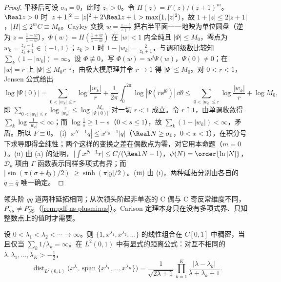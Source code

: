 \begin{proof}
平移后可设 $\sigma_0=0$，此时 $z_1>0$。令 $H(z)=F(z)/(z+1)^m$。$\Real z>0$ 时 $|z+1|^2=|z|^2+2\Real z+1>\max(1,|z|^2)$，故 $1+|z|\le2|z+1|$，$|H|\le2^mC\equiv M_0$。Cayley 变换 $w=\frac{z-1}{z+1}$ 把右半平面一一地映为单位圆盘（逆为 $z=\frac{1+w}{1-w}$），$\Phi(w)=H(\frac{1+w}{1-w})$ 在 $|w|<1$ 内全纯且 $|\Phi|\le M_0$，零点为 $w_k=\frac{z_k-1}{z_k+1}\in(-1,1)$；$z_k>1$ 时 $1-|w_k|=\frac{2}{z_k+1}$，与调和级数比较知 $\sum_k(1-|w_k|)=\infty$。设 $\Phi\not\equiv0$，写 $\Phi(w)=w^j\Psi(w)$，$\Psi(0)\ne0$；在 $|w|=r$ 上 $|\Psi|\le M_0r^{-j}$，由极大模原理并令 $r\to1$ 得 $|\Psi|\le M_0$。对 $0<r<1$，Jensen 公式\cite[第~15.16--15.20~节]{Rudin1987}给出
\[
\log|\Psi(0)|=\sum_{0<|w_k|\le r}\log\frac{|w_k|}{r}+\frac1{2\pi}\int_0^{2\pi}\log|\Psi(r\ee^{\ii\theta})|\,\dd\theta\le\sum_{0<|w_k|\le r}\log\frac{|w_k|}{r}+\log M_0 ,
\]
即 $\sum_{0<|w_k|\le r}\log\frac{r}{|w_k|}\le\log\frac{M_0}{|\Psi(0)|}$ 对一切 $r<1$ 成立。令 $r\uparrow1$，由单调收敛得 $\sum_k\log\frac1{|w_k|}<\infty$；而 $\log\frac1s\ge1-s$（$0<s\le1$），故 $\sum_k(1-|w_k|)<\infty$，矛盾。所以 $F\equiv0$。
(i) $|x^{N-1}q|\le x^{\sigma_0-1}|q|$（$\Real N\ge\sigma_0$，$0<x<1$），在积分号下求导即得全纯性；两个这样的变换之差在偶数点为零，对它用本命题（$m=0$）。(ii) 由 (a) 的证明，$|\int x^{N-1}r|\le C/(\Real N-1)$，$\psi(N)=\order{\ln|N|}$，$\mathcal D_k$ 项由 $\Gamma$ 函数表示同样多项式有界；而 $|\sin(\pi(\sigma+\ii y)/2)|\ge\sinh(\pi|y|/2)$。(iii) 由 (i)，两种延拓分别由各自的 $q\pm\bar q$ 唯一确定。
\end{proof}

领头阶 $qq$ 道两种延拓相同；从次领头阶起非单态的 C 偶与 C 奇反常维度不同，$P^+_{\mathrm{NS}}\ne P^-_{\mathrm{NS}}$（\cref{rem:pdf-ns-plusminus}）。Carlson 定理本身只在没有多项式界、只知整数点上的值时才需要。

\begin{theorem}\label{thm:appK-muntz}
设 $0<\lambda_1<\lambda_2<\cdots\to\infty$。则 $\{1,x^{\lambda_1},x^{\lambda_2},\dots\}$ 的线性组合在 $C[0,1]$ 中稠密，当且仅当 $\sum_k1/\lambda_k=\infty$。在 $L^2(0,1)$ 中有显式的距离公式：对互不相同的 $\lambda,\lambda_1,\dots,\lambda_K>-\frac12$，
\begin{equation}\label{eq:appK-muntz}
\operatorname{dist}_{L^2(0,1)}\big(x^\lambda,\operatorname{span}\{x^{\lambda_1},\dots,x^{\lambda_K}\}\big)=\frac{1}{\sqrt{2\lambda+1}}\prod_{k=1}^K\frac{|\lambda-\lambda_k|}{\lambda+\lambda_k+1}.
\end{equation}
\end{theorem}

